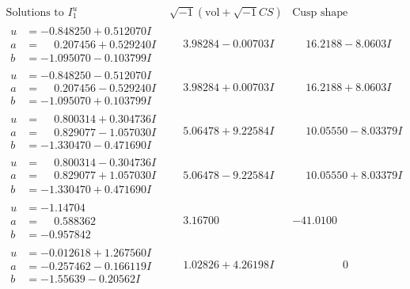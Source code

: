 \documentclass[1p]{elsarticle_modified}
\theoremstyle{definition}
\newcommand{\I}{\sqrt{-1}}
\begin{document}
$$\begin{array}{c|c|c}  
\text{Solutions to }I^u_{1}& \I (\text{vol} + \sqrt{-1}CS) & \text{Cusp shape}\\
 \hline 
\begin{aligned}
u &= -0.848250 + 0.512070 I \\
a &= \phantom{-}0.207456 + 0.529240 I \\
b &= -1.095070 - 0.103799 I\end{aligned}
 & \phantom{-}3.98284 - 0.00703 I & \phantom{-}16.2188 - 8.0603 I \\ \hline\begin{aligned}
u &= -0.848250 - 0.512070 I \\
a &= \phantom{-}0.207456 - 0.529240 I \\
b &= -1.095070 + 0.103799 I\end{aligned}
 & \phantom{-}3.98284 + 0.00703 I & \phantom{-}16.2188 + 8.0603 I \\ \hline\begin{aligned}
u &= \phantom{-}0.800314 + 0.304736 I \\
a &= \phantom{-}0.829077 - 1.057030 I \\
b &= -1.330470 - 0.471690 I\end{aligned}
 & \phantom{-}5.06478 + 9.22584 I & \phantom{-}10.05550 - 8.03379 I \\ \hline\begin{aligned}
u &= \phantom{-}0.800314 - 0.304736 I \\
a &= \phantom{-}0.829077 + 1.057030 I \\
b &= -1.330470 + 0.471690 I\end{aligned}
 & \phantom{-}5.06478 - 9.22584 I & \phantom{-}10.05550 + 8.03379 I \\ \hline\begin{aligned}
u &= -1.14704\phantom{ +0.000000I} \\
a &= \phantom{-}0.588362\phantom{ +0.000000I} \\
b &= -0.957842\phantom{ +0.000000I}\end{aligned}
 & \phantom{-}3.16700\phantom{ +0.000000I} & -41.0100\phantom{ +0.000000I} \\ \hline\begin{aligned}
u &= -0.012618 + 1.267560 I \\
a &= -0.257462 - 0.166119 I \\
b &= -1.55639 - 0.20562 I\end{aligned}
 & \phantom{-}1.02826 + 4.26198 I & \phantom{-0.000000 } 0 \\ \hline\begin{aligned}

\end{aligned}
\end{array}$$
\end{document}
